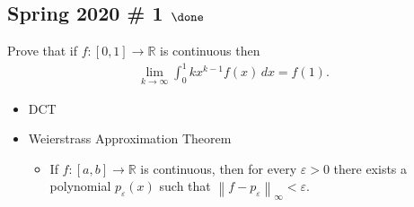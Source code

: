 \hypertarget{spring-2020-1-done}{%
\subsection{\texorpdfstring{Spring 2020 \# 1
\(\done\)}{Spring 2020 \# 1 \textbackslash done}}\label{spring-2020-1-done}}

Prove that if \(f: [0, 1] \to {\mathbb{R}}\) is continuous then
\begin{align*}
\lim_{k\to\infty} \int_0^1 kx^{k-1} f(x) \,dx = f(1)
.\end{align*}

\begin{concept}

\envlist

\begin{itemize}
\tightlist
\item
  DCT
\item
  Weierstrass Approximation Theorem

  \begin{itemize}
  \tightlist
  \item
    If \(f: [a, b] \to {\mathbb{R}}\) is continuous, then for every
    \({\varepsilon}>0\) there exists a polynomial \(p_{\varepsilon}(x)\)
    such that
    \({\left\lVert {f - p_{\varepsilon}} \right\rVert}_\infty < {\varepsilon}\).
  \end{itemize}
\end{itemize}

\end{concept}

